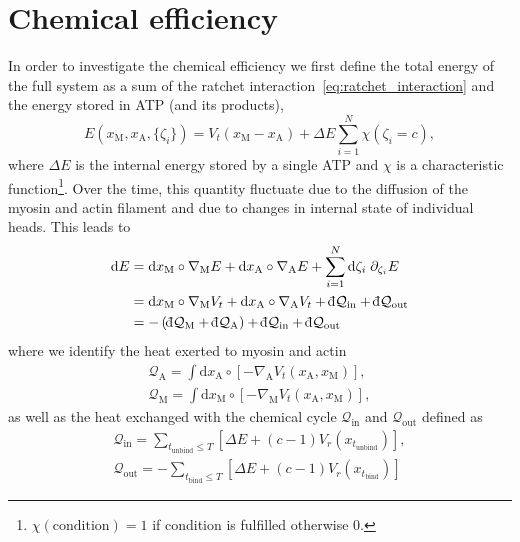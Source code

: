 \documentclass[aps,pre,twocolumn,showpacs,showkeys]{revtex4-1}
\newcommand{\rmd}{{\mathrm d}}
\newcommand{\dbar}{{\mathchar '26 \mkern-11mu {\mathrm d}}}
\begin{document}
\section{Chemical efficiency}
\label{sec:energie}
In order to investigate the chemical efficiency 
we first define the total energy of the full system as a sum of the ratchet interaction~\eqref{eq:ratchet_interaction}
and the energy stored in ATP (and its products), 
\begin{equation*}
E( x_\text{M}, x_\text{A}, \{ \zeta_i \}) = V_t( x_\text{M} - x_\text{A} ) + \Delta E \sum\limits_{i=1}^N \chi( \zeta_i = c ) ,
\end{equation*}
where $\Delta E$ is the internal energy stored by a single ATP and $\chi$ is a characteristic function\footnote{
$\chi(\text{condition}) = 1$ if condition is fulfilled otherwise $0$.
}.
Over the time, this quantity fluctuate due to the diffusion of the myosin and actin filament and due to changes in internal state of individual heads.
This leads to 
\begin{align}
\rmd E 
&= \rmd x_\text{M} \circ \nabla_\text{M} E  
+ \rmd x_\text{A} \circ \nabla_\text{A} E 
+ \sum\limits_{i=1}^N \rmd \zeta_i \; \partial_{\zeta_i} E  
\nonumber \\
&= \rmd x_\text{M} \circ \nabla_\text{M} V_t  
+ \rmd x_\text{A} \circ \nabla_\text{A} V_t 
+ \dbar {\mathcal Q}_\text{in} 
+ \dbar {\mathcal Q}_\text{out} 
\nonumber \\
&= - \left( \dbar {\mathcal Q}_\text{M} + \dbar {\mathcal Q}_\text{A} \right) 
+ \dbar {\mathcal Q}_{\text{in}} 
+ \dbar {\mathcal Q}_{\text{out}}
\end{align}
where we identify the heat  exerted to myosin and actin 
\begin{gather*}
{\mathcal Q}_\text{A} = \int \rmd x_\text{A} \circ \left[ - \nabla_\text{A} V_t( x_\text{A}, x_\text{M} ) \right], \\
{\mathcal Q}_\text{M} = \int \rmd x_\text{M} \circ \left[ - \nabla_\text{M} V_t( x_\text{A}, x_\text{M} ) \right],
\end{gather*}
as well as the heat exchanged with the chemical cycle $\mathcal Q_\text{in}$ and $\mathcal Q_\text{out}$ defined as 
\begin{gather}
{\mathcal Q}_\text{in} = \sum_{t_\text{unbind} \leq T} \left[ \Delta E + (c-1) V_r(x_{t_\text{unbind}}) \right] , 
\label{q_in} \\
{\mathcal Q}_\text{out} = -\sum_{t_\text{bind} \leq T} \left[ \Delta E + (c-1) V_r(x_{t_\text{bind}}) \right] 
\label{q_out}
\end{gather}
\end{document}
